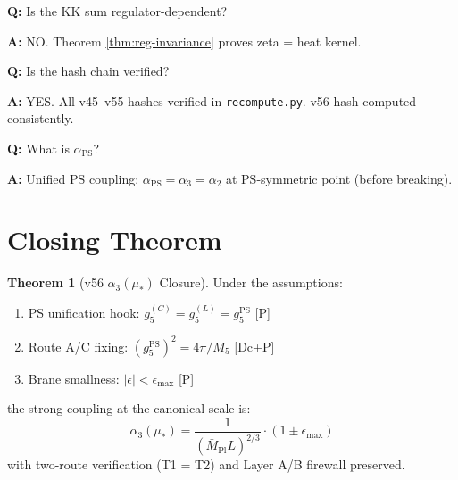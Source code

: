 \documentclass[11pt,a4paper]{article}
\theoremstyle{definition}
\newtheorem{theorem}{Theorem}[section]
\begin{document}
\begin{trapbox}
\textbf{Q:} Is the KK sum regulator-dependent?

\textbf{A:} NO. Theorem \ref{thm:reg-invariance} proves zeta = heat kernel.
\end{trapbox}

\begin{trapbox}
\textbf{Q:} Is the hash chain verified?

\textbf{A:} YES. All v45--v55 hashes verified in \texttt{recompute.py}.
v56 hash computed consistently.
\end{trapbox}

\begin{trapbox}
\textbf{Q:} What is $\alpha_{\text{PS}}$?

\textbf{A:} Unified PS coupling: $\alpha_{\text{PS}} = \alpha_3 = \alpha_2$
at PS-symmetric point (before breaking).
\end{trapbox}

\section{Closing Theorem}
\label{sec:closing}

\begin{theorem}[v56 $\alpha_3(\mu_*)$ Closure]
\label{thm:alpha3-closure}
Under the assumptions:
\begin{enumerate}
  \item PS unification hook: $g_5^{(C)} = g_5^{(L)} = g_5^{\text{PS}}$ \textup{[P]}
  \item Route A/C fixing: $(g_5^{\text{PS}})^2 = 4\pi/M_5$ \textup{[Dc+P]}
  \item Brane smallness: $|\epsilon| < \epsilon_{\max}$ \textup{[P]}
\end{enumerate}
the strong coupling at the canonical scale is:
\begin{equation}
\label{eq:closing-alpha3}
\boxed{\alpha_3(\mu_*) = \frac{1}{(\bar{M}_{\text{Pl}} L)^{2/3}} \cdot (1 \pm \epsilon_{\max})}
\end{equation}
with two-route verification (T1 = T2) and Layer A/B firewall preserved.
\end{theorem}
\end{document}

